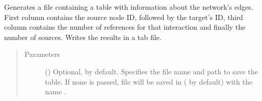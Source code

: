 \documentclass[letterpaper,10pt,english]{sphinxmanual}
\begin{document}
\begin{fulllineitems}
\begin{fulllineitems}
\begin{quote}
\begin{description}
\end{description}\end{quote}

\end{fulllineitems}


\begin{fulllineitems}
\label{\detokenize{main:pypath.main.PyPath.reference_hist}}
Generates a file containing a table with information about the
network’s edges. First column contains the source node ID,
followed by the target’s ID, third column contains the number of
references for that interaction and finally the number of
sources. Writes the results in a tab file.
\begin{quote}\begin{description}
\item[{Parameters}] \leavevmode
{} () \textendash{} Optional,  by default. Specifies the file name and
path to save the table. If none is passed, file will be
saved in  (
by default) with the name .

\end{description}\end{quote}

\end{fulllineitems}


\begin{fulllineitems}
\label{\detokenize{main:pypath.main.PyPath.reload}}
\end{fulllineitems}


\begin{fulllineitems}
\label{\detokenize{main:pypath.main.PyPath.remove_htp}}
\end{fulllineitems}


\end{fulllineitems}
\end{document}
